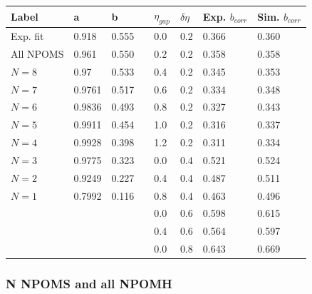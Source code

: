 \documentclass[]{article}
\begin{document}
\begin{table}[h!]
\centering
    \begin{tabular}{|l|l|l|c|l|l|l|l|}
        \hline
Label     & a      & b     &     & $\eta_{gap}$ & $\delta\eta$ &Exp. $b_{corr}$ &Sim. $b_{corr}$\\\hline
Exp. fit  & 0.918  & 0.555 &     & 0.0 		    & 0.2 		   &0.366  		    &0.360\\\hline
All NPOMS &	0.961  & 0.550 &	 & 0.2 			& 0.2 		   &0.358  		    &0.358\\\hline 
$N = 8$	  &	0.97   & 0.533 &	 & 0.4 			& 0.2 		   &0.345  		    &0.353\\\hline
$N = 7$	  &	0.9761 & 0.517 &	 & 0.6 			& 0.2 		   &0.334  		    &0.348\\\hline
$N = 6$	  &	0.9836 & 0.493 &	 & 0.8 			& 0.2 		   &0.327  		    &0.343\\\hline
$N = 5$	  &	0.9911 & 0.454 &	 & 1.0 			& 0.2 		   &0.316  		    &0.337\\\hline
$N = 4$	  &	0.9928 & 0.398 &	 & 1.2 			& 0.2 		   &0.311  		    &0.334\\\hline
$N = 3$	  &	0.9775 & 0.323 &	 & 0.0 			& 0.4 		   &0.521  		    &0.524\\\hline
$N = 2$	  &	0.9249 & 0.227 &	 & 0.4 			& 0.4 		   &0.487  		    &0.511\\\hline
$N = 1$	  &	0.7992 & 0.116 &	 & 0.8 			& 0.4 		   &0.463  		    &0.496\\\hline
		  &	  	   &       &	 & 0.0			& 0.6		   &0.598		    &0.615\\\hline
	      &        &       &     & 0.4 			& 0.6 		   &0.564  		    &0.597\\\hline
		  &	  	   &       &	 & 0.0 			& 0.8 		   &0.643  		    &0.669\\\hline
    \end{tabular}
\caption[b correlation table]{}
\end{table}

\newpage
\subsubsection*{\centering N NPOMS and all NPOMH}
\end{document}
